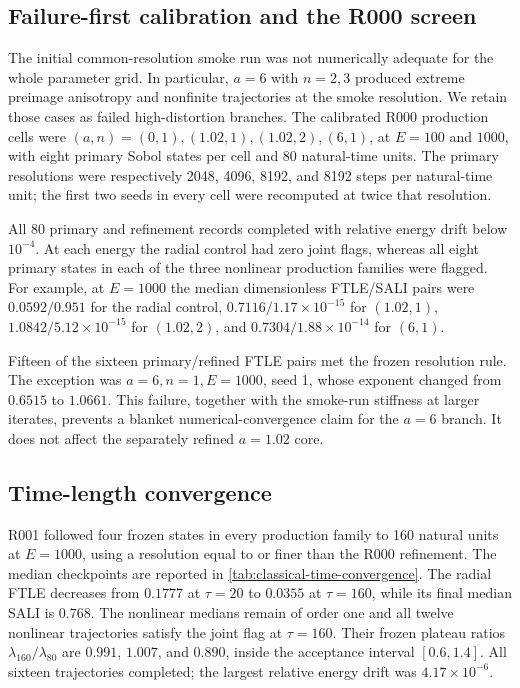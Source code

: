 \subsection{Failure-first calibration and the R000 screen}

The initial common-resolution smoke run was not numerically adequate for the
whole parameter grid.  In particular, \(a=6\) with \(n=2,3\) produced extreme
preimage anisotropy and nonfinite trajectories at the smoke resolution.  We
retain those cases as failed high-distortion branches.  The calibrated R000
production cells were
\((a,n)=(0,1),(1.02,1),(1.02,2),(6,1)\), at
\(E=100\) and \(1000\), with eight primary Sobol states per cell and 80
natural-time units.  The primary resolutions were respectively
2048, 4096, 8192, and 8192 steps per natural-time unit; the first two seeds in
every cell were recomputed at twice that resolution.

All 80 primary and refinement records completed with relative energy drift
below \(10^{-4}\).  At each energy the radial control had zero joint flags,
whereas all eight primary states in each of the three nonlinear production
families were flagged.  For example, at \(E=1000\) the median dimensionless
FTLE/SALI pairs were \(0.0592/0.951\) for the radial control,
\(0.7116/1.17\times10^{-15}\) for \((1.02,1)\),
\(1.0842/5.12\times10^{-15}\) for \((1.02,2)\), and
\(0.7304/1.88\times10^{-14}\) for \((6,1)\).

Fifteen of the sixteen primary/refined FTLE pairs met the frozen resolution
rule.  The exception was \(a=6,n=1,E=1000\), seed 1, whose exponent changed
from \(0.6515\) to \(1.0661\).  This failure, together with the smoke-run
stiffness at larger iterates, prevents a blanket numerical-convergence claim
for the \(a=6\) branch.  It does not affect the separately refined
\(a=1.02\) core.

\subsection{Time-length convergence}

R001 followed four frozen states in every production family to 160 natural
units at \(E=1000\), using a resolution equal to or finer than the R000
refinement.  The median checkpoints are reported in
\cref{tab:classical-time-convergence}.  The radial FTLE decreases from
\(0.1777\) at \(\tau=20\) to \(0.0355\) at \(\tau=160\), while its final
median SALI is \(0.768\).  The nonlinear medians remain of order one and all
twelve nonlinear trajectories satisfy the joint flag at \(\tau=160\).
Their frozen plateau ratios \(\lambda_{160}/\lambda_{80}\) are
\(0.991\), \(1.007\), and \(0.890\), inside the acceptance interval
\([0.6,1.4]\).  All sixteen trajectories completed; the largest relative
energy drift was \(4.17\times10^{-6}\).


